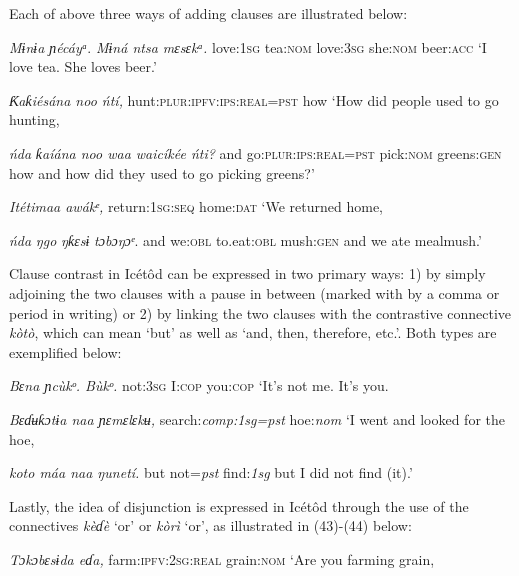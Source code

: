 Each of above three ways of adding clauses are illustrated below:




\textit{Mɨnɨa     ɲécáyᵃ}.\textit{   Mɨná       ntsa   mɛsɛkᵃ.}
love:\textsc{1sg}   tea:\textsc{nom}   love:\textsc{3sg} she:\textsc{nom}   beer:\textsc{acc}
‘I love tea. She loves beer.’




\textit{Ƙ}\textit{aƙiésána noo       ńtí,}
hunt:\textsc{plur:ipfv:ips:real=pst}   how
‘How did people used to go hunting,



\textit{ńda}\textit{   ƙaíána noo         waa   waicíkée     ńti?}
and   go:\textsc{plur:ips:real=pst} pick:\textsc{nom} greens:\textsc{gen} how
and how did they used to go picking greens?’




\textit{Itétimaa awákᵉ,}
return:\textsc{1sg:seq} home:\textsc{dat} 
‘We returned home,



\textit{ńda}\textit{}  \textit{ŋgo}\textit{}     \textit{ŋƙɛsɨ}\textit{}     \textit{tɔbɔŋɔᵉ}.
and   we:\textsc{obl}   to.eat:\textsc{obl}   mush:\textsc{gen}
and we ate mealmush.’


Clause contrast in Icétôd can be expressed in two primary ways: 1) by simply adjoining the two clauses with a pause in between (marked with by a comma or period in writing) or 2) by linking the two clauses with the contrastive connective \textit{kòtò}, which can mean ‘but’ as well as ‘and, then, therefore, etc.’. Both types are exemplified below:



\textit{Bɛna     ɲcùkᵒ.     Bùkᵒ.}
not:\textsc{3sg}   I:\textsc{cop}     you:\textsc{cop}
‘It’s not me. It’s you.




\textit{Bɛɗʉƙɔtɨa naa     ɲɛmɛlɛkʉ,}
search:\textit{comp:1sg=pst}   hoe:\textit{nom}
‘I went and looked for the hoe,



\textit{koto   máa naa   ŋunetí.}
but   not=\textit{pst}   find:\textit{1sg}
but I did not find (it).’


Lastly, the idea of disjunction is expressed in Icétôd through the use of the connectives \textit{kèɗè} ‘or’ or \textit{kòrì} ‘or’, as illustrated in (43)-(44) below:



\textit{Tɔkɔbɛsɨda       eɗa,} 
farm:\textsc{ipfv:2sg:real}   grain:\textsc{nom}
‘Are you farming grain,




